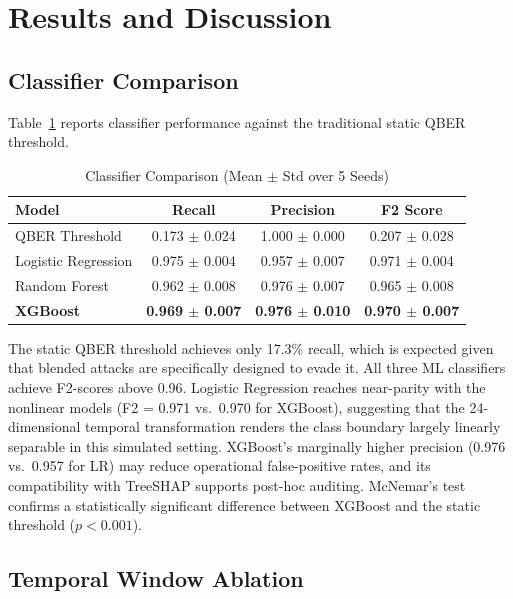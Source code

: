 \documentclass[conference]{IEEEtran}
\begin{document}
\section{Results and Discussion}

\subsection{Classifier Comparison}

Table~\ref{tab:baselines} reports classifier performance against the traditional static QBER threshold.

\begin{table}[htbp]
\caption{Classifier Comparison (Mean $\pm$ Std over 5 Seeds)}
\label{tab:baselines}
\centering
\begin{tabular}{lccc}
\toprule
\textbf{Model} & \textbf{Recall} & \textbf{Precision} & \textbf{F2 Score} \\
\midrule
QBER Threshold      & 0.173 $\pm$ 0.024 & 1.000 $\pm$ 0.000 & 0.207 $\pm$ 0.028 \\
Logistic Regression & 0.975 $\pm$ 0.004 & 0.957 $\pm$ 0.007 & 0.971 $\pm$ 0.004 \\
Random Forest       & 0.962 $\pm$ 0.008 & 0.976 $\pm$ 0.007 & 0.965 $\pm$ 0.008 \\
\textbf{XGBoost}    & \textbf{0.969 $\pm$ 0.007} & \textbf{0.976 $\pm$ 0.010} & \textbf{0.970 $\pm$ 0.007} \\
\bottomrule
\end{tabular}
\end{table}

The static QBER threshold achieves only 17.3\% recall, which is expected given that blended attacks are specifically designed to evade it. All three ML classifiers achieve F2-scores above 0.96. Logistic Regression reaches near-parity with the nonlinear models (F2 = 0.971 vs.\ 0.970 for XGBoost), suggesting that the 24-dimensional temporal transformation renders the class boundary largely linearly separable in this simulated setting. XGBoost's marginally higher precision (0.976 vs.\ 0.957 for LR) may reduce operational false-positive rates, and its compatibility with TreeSHAP supports post-hoc auditing. McNemar's test confirms a statistically significant difference between XGBoost and the static threshold ($p < 0.001$).

\subsection{Temporal Window Ablation}
\end{document}
